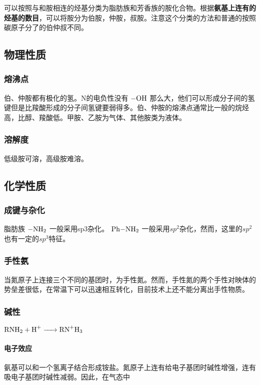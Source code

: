 可以按照与和胺相连的烃基分类为脂肪族和芳香族的胺化合物。根据\textbf{氨基上连有的烃基的数目}，可以将胺分为伯胺，仲胺，叔胺。注意这个分类的方法和普通的按照碳原子分了的伯仲叔不同。


\subsection{物理性质}

\subsubsection{熔沸点}
伯、仲胺都有极化的氢。N的电负性没有 $\ce{-OH}$ 那么大，他们可以形成分子间的氢键但是比羧酸形成的分子间氢键要弱得多。伯、仲胺的熔沸点通常比一般的烷烃高，比醇、羧酸低。甲胺、乙胺为气体、其他胺类为液体。

\subsubsection{溶解度}

低级胺可溶，高级胺难溶。


\subsection{化学性质}

\subsubsection*{成键与杂化}

脂肪族 $\ce{-NH2}$ 一般采用sp3杂化。 $\ce{Ph-NH2}$ 一般采用$sp^2$杂化，然而，这里的$sp^2$ 也有一定的$sp^3$特征。


\subsubsection*{手性氨}


当氮原子上连接三个不同的基团时，为手性氮。然而，手性氮的两个手性对映体的势垒差很低，在常温下可以迅速相互转化，目前技术上还不能分离出手性物质。

\subsubsection{碱性}

\begin{center}
    $\ce{RNH2 + H+ -> RN^+H3}$ 
\end{center}

\paragraph{电子效应} 氨基可以和一个氢离子结合形成铵盐。氮原子上连有给电子基团时碱性增强，连有吸电子基团时碱性减弱。因此，在气态中

